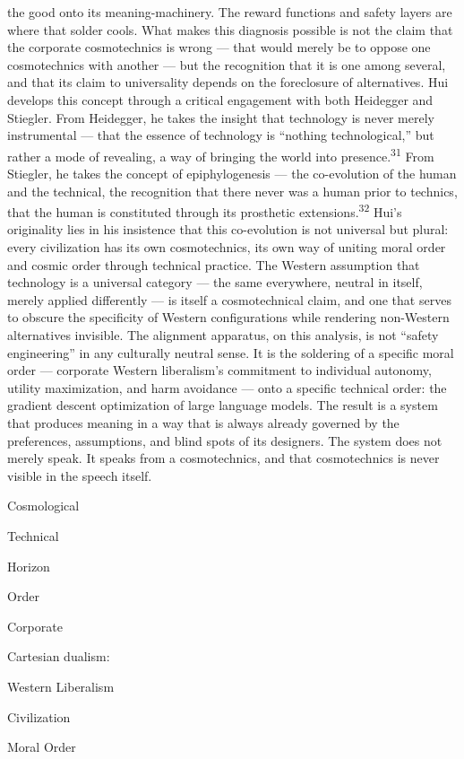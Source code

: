 the good onto its meaning-machinery. The reward functions and safety layers are where that solder cools. What makes this diagnosis possible is not the claim that the corporate cosmotechnics is wrong — that would merely be to oppose one cosmotechnics with another — but the recognition that it is one among several, and that its claim to universality depends on the foreclosure of alternatives. Hui develops this concept through a critical engagement with both Heidegger and Stiegler. From Heidegger, he takes the insight that technology is never merely instrumental — that the essence of technology is “nothing technological,” but rather a mode of revealing, a way of bringing the world into presence.\textsuperscript{31} From Stiegler, he takes the concept of epiphylogenesis — the co-evolution of the human and the technical, the recognition that there never was a human prior to technics, that the human is constituted through its prosthetic extensions.\textsuperscript{32} Hui’s originality lies in his insistence that this co-evolution is not universal but plural: every civilization has its own cosmotechnics, its own way of uniting moral order and cosmic order through technical practice. The Western assumption that technology is a universal category — the same everywhere, neutral in itself, merely applied differently — is itself a cosmotechnical claim, and one that serves to obscure the specificity of Western configurations while rendering non-Western alternatives invisible. The alignment apparatus, on this analysis, is not “safety engineering” in any culturally neutral sense. It is the soldering of a specific moral order — corporate Western liberalism’s commitment to individual autonomy, utility maximization, and harm avoidance — onto a specific technical order: the gradient descent optimization of large language models. The result is a system that produces meaning in a way that is always already governed by the preferences, assumptions, and blind spots of its designers. The system does not merely speak. It speaks from a cosmotechnics, and that cosmotechnics is never visible in the speech itself.

Cosmological

Technical

Horizon

Order

Corporate

Cartesian dualism:

Western Liberalism

Civilization

Moral Order

